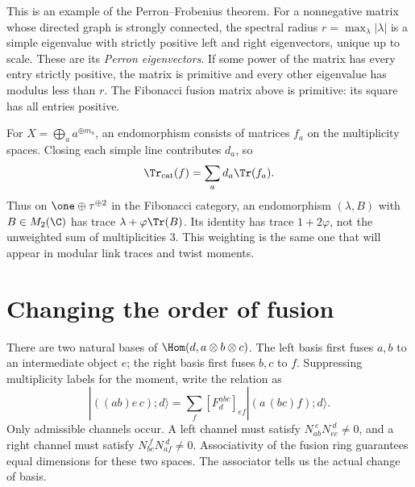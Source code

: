 This is an example of the Perron--Frobenius theorem. For a
nonnegative matrix whose directed graph is strongly connected, the
spectral radius $r=\max_\lambda|\lambda|$ is a simple eigenvalue
with strictly positive left and right eigenvectors, unique up to scale.
These are its \emph{Perron eigenvectors}. If some power of the
matrix has every entry strictly positive, the matrix is primitive
and every other eigenvalue has modulus less than $r$. The Fibonacci
fusion matrix above is primitive: its square has all entries positive.

\begin{example}
For $X=\bigoplus_a a^{\oplus m_a}$, an endomorphism consists of
matrices $f_a$ on the multiplicity spaces. Closing each simple line
contributes $d_a$, so
\[
 \Tr_{\rm cat}(f)=\sum_a d_a\Tr(f_a).
\]
Thus on $\one\oplus\tau^{\oplus2}$ in the Fibonacci category,
an endomorphism $(\lambda,B)$ with $B\in M_2(\C)$ has trace
$\lambda+\varphi\Tr(B)$. Its identity has trace $1+2\varphi$,
not the unweighted sum of multiplicities $3$. This weighting is the
same one that will appear in modular link traces and twist moments.
\end{example}

\section{Changing the order of fusion}

There are two natural bases of
$\Hom(d,a\otimes b\otimes c)$.  The left basis first fuses $a,b$ to
an intermediate object $e$; the right basis first fuses $b,c$ to $f$.
Suppressing multiplicity labels for the moment, write the relation as
\begin{equation}
 |((ab)e\,c);d\rangle
 =\sum_f [F^{abc}_{d}]_{ef}
 |(a\,(bc)f);d\rangle.
 \label{eq:F-basis-convention}
\end{equation}
Only admissible channels occur.  A left channel must satisfy
$N_{ab}^{\ e}N_{ec}^{\ d}\ne0$, and a right channel must satisfy
$N_{bc}^{\ f}N_{af}^{\ d}\ne0$.  Associativity of the fusion ring
guarantees equal dimensions for these two spaces.  The associator tells
us the actual change of basis.

